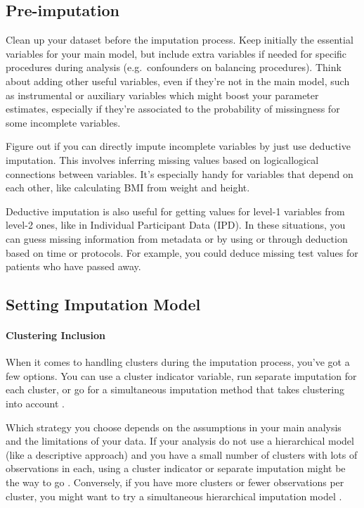 \documentclass[
  article]{jss}
\let\oldparagraph\paragraph
\renewcommand{\paragraph}[1]{\oldparagraph{#1}\mbox{}}
\begin{document}
\hypertarget{pre-imputation}{%
\subsection{Pre-imputation}\label{pre-imputation}}

Clean up your dataset before the imputation process. Keep initially the
essential variables for your main model, but include extra variables if
needed for specific procedures during analysis (e.g.~confounders on
balancing procedures). Think about adding other useful variables, even
if they're not in the main model, such as instrumental or auxiliary
variables which might boost your parameter estimates, especially if
they're associated to the probability of missingness for some incomplete
variables.

Figure out if you can directly impute incomplete variables by just use
deductive imputation. This involves inferring missing values based on
logicallogical connections between variables. It's especially handy for
variables that depend on each other, like calculating BMI from weight
and height.

Deductive imputation is also useful for getting values for level-1
variables from level-2 ones, like in Individual Participant Data (IPD).
In these situations, you can guess missing information from metadata or
by using or through deduction based on time or protocols. For example,
you could deduce missing test values for patients who have passed away.

\hypertarget{setting-imputation-model}{%
\subsection{Setting Imputation Model}\label{setting-imputation-model}}

\hypertarget{clustering-inclusion}{%
\paragraph{Clustering Inclusion}\label{clustering-inclusion}}

When it comes to handling clusters during the imputation process, you've
got a few options. You can use a cluster indicator variable, run
separate imputation for each cluster, or go for a simultaneous
imputation method that takes clustering into account \cite{eddings}.

Which strategy you choose depends on the assumptions in your main
analysis and the limitations of your data. If your analysis do not use a
hierarchical model (like a descriptive approach) and you have a small
number of clusters with lots of observations in each, using a cluster
indicator or separate imputation might be the way to go
\cite{graham2009}. Conversely, if you have more clusters or fewer
observations per cluster, you might want to try a simultaneous
hierarchical imputation model \cite{Allison_2002}.
\end{document}
